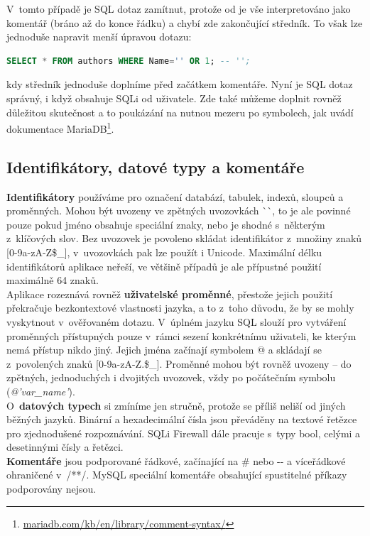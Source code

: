 V~tomto případě je SQL dotaz zamítnut, protože od \uv{-{}-} je vše interpretováno jako komentář (bráno až do konce řádku) a chybí zde zakončující středník. 
To však lze jednoduše napravit menší úpravou dotazu:
\begin{lstlisting}[language=sql]
SELECT * FROM authors WHERE Name='' OR 1; -- '';
\end{lstlisting}

kdy středník jednoduše doplníme před začátkem komentáře. Nyní je SQL dotaz správný, i když obsahuje SQLi od uživatele.
Zde také můžeme doplnit rovněž důležitou skutečnost a to poukázání na nutnou mezeru po \uv{-{}-} symbolech, jak uvádí dokumentace 
MariaDB\footnote{\url{mariadb.com/kb/en/library/comment-syntax/}}.

\subsection{Identifikátory, datové typy a komentáře} \label{subsec:6:identifier}
\textbf{Identifikátory} používáme pro označení databází, tabulek, indexů, sloupců a proměnných. Mohou být uvozeny ve zpětných uvozovkách 
\`{}\`{}, to je ale povinné pouze pokud jméno obsahuje speciální znaky, nebo je shodné s~některým z~klíčových slov.
Bez uvozovek je povoleno skládat identifikátor z~množiny znaků [0-9a-zA-Z\$\_], v~uvozovkách pak lze použít i Unicode.
Maximální délku identifikátorů aplikace neřeší, ve většině případů je ale přípustné použití maximálně 64 znaků. \\

Aplikace rozeznává rovněž \textbf{uživatelské proměnné}, přestože jejich použití překračuje bezkontextové vlastnosti jazyka, a to z~toho důvodu, že by
se mohly vyskytnout v~ověřovaném dotazu. V~úplném jazyku SQL slouží pro vytváření proměnných přístupných pouze v~rámci sezení konkrétnímu uživateli, 
ke kterým nemá přístup nikdo jiný. Jejich jména začínají symbolem @ a skládají se z~povolených znaků [0-9a-zA-Z.\$\_]. Proměnné mohou být rovněž
uvozeny -- do zpětných, jednoduchých i dvojitých uvozovek, vždy po počátečním symbolu (\textit{@'var\_name'}). \\

O~\textbf{datových typech} si zmíníme jen stručně, protože se příliš neliší od jiných běžných jazyků. Binární a hexadecimální čísla jsou převáděny
na textové řetězce pro zjednodušené rozpoznávání. SQLi Firewall dále pracuje s~typy bool, celými a desetinnými čísly a řetězci. \\

\textbf{Komentáře} jsou podporované řádkové, začínající na \# nebo -{}- a víceřádkové ohraničené v~/**/. MySQL speciální komentáře obsahující
spustitelné příkazy podporovány nejsou.

